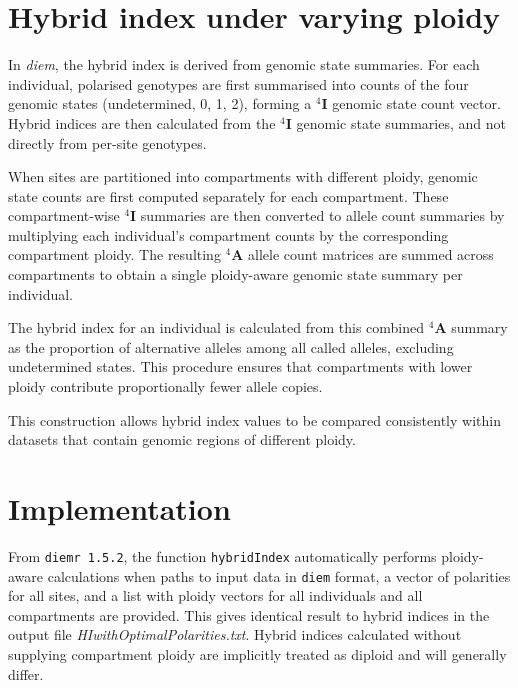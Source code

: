 \documentclass[
]{book}
\begin{document}
\section{Hybrid index under varying ploidy}\label{hybrid-index-under-varying-ploidy}

In \emph{diem}, the hybrid index is derived from genomic state summaries. For each individual, polarised genotypes are first summarised into counts of the four genomic states (undetermined, 0, 1, 2), forming a \({}^4\mathbf{I}\) genomic state count vector. Hybrid indices are then calculated from the \({}^4\mathbf{I}\) genomic state summaries, and not directly from per-site genotypes.

When sites are partitioned into compartments with different ploidy, genomic state counts are first computed separately for each compartment. These compartment-wise \({}^4\mathbf{I}\) summaries are then converted to allele count summaries by multiplying each individual's compartment counts by the corresponding compartment ploidy. The resulting \({}^4\mathbf{A}\) allele count matrices are summed across compartments to obtain a single ploidy-aware genomic state summary per individual.

The hybrid index for an individual is calculated from this combined \({}^4\mathbf{A}\) summary as the proportion of alternative alleles among all called alleles, excluding undetermined states. This procedure ensures that compartments with lower ploidy contribute proportionally fewer allele copies.

This construction allows hybrid index values to be compared consistently within datasets that contain genomic regions of different ploidy.

\section{Implementation}\label{implementation}

From \texttt{diemr\ 1.5.2}, the function \texttt{hybridIndex} automatically performs ploidy-aware calculations when paths to input data in \texttt{diem} format, a vector of polarities for all sites, and a list with ploidy vectors for all individuals and all compartments are provided. This gives identical result to hybrid indices in the output file \emph{HIwithOptimalPolarities.txt}. Hybrid indices calculated without supplying compartment ploidy are implicitly treated as diploid and will generally differ.
\end{document}
